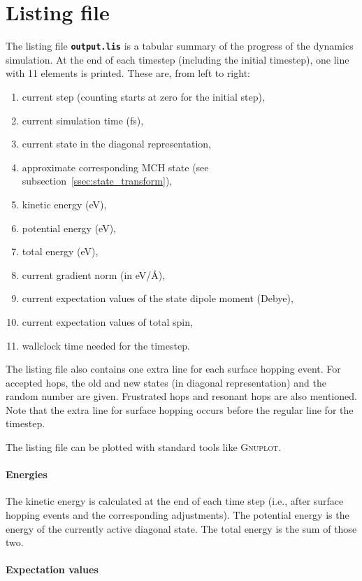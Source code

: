 \documentclass[a4paper,11pt,DIV=15,openany,twoside=false]{scrbook}
\newcommand{\ttt}[1]{\textbf{\texttt{#1}}}
\begin{document}
\section{Listing file}\label{sec:lisfile}

The listing file \ttt{output.lis} is a tabular summary of the progress of the dynamics simulation. At the end of each timestep (including the initial timestep), one line with 11 elements is printed. These are, from left to right:
\begin{enumerate}
  \item current step (counting starts at zero for the initial step),
  \item current simulation time (fs),
  \item current state in the diagonal representation,
  \item approximate corresponding MCH state (see subsection~\ref{ssec:state_transform}),
  \item kinetic energy (eV),
  \item potential energy (eV),
  \item total energy (eV),
  \item current gradient norm (in eV/\AA),
  \item current expectation values of the state dipole moment (Debye),
  \item current expectation values of total spin,
  \item wallclock time needed for the timestep.
\end{enumerate}
The listing file also contains one extra line for each surface hopping event. For accepted hops, the old and new states (in diagonal representation) and the random number are given. Frustrated hops and resonant hops are also mentioned. Note that the extra line for surface hopping occurs before the regular line for the timestep. 

The listing file can be plotted with standard tools like \textsc{Gnuplot}. 

\paragraph{Energies}

The kinetic energy is calculated at the end of each time step (i.e., after surface hopping events and the corresponding adjustments). The potential energy is the energy of the currently active diagonal state. The total energy is the sum of those two.

\paragraph{Expectation values}
\end{document}
